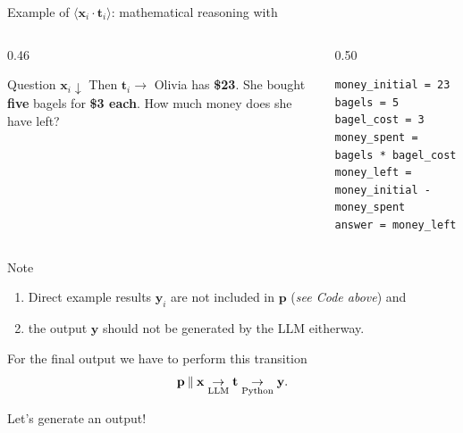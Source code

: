 \begin{frame}[fragile]{Example of \(\langle \mathbf{x}_i \cdot \mathbf{t}_i \rangle\): mathematical reasoning with \PAL{}}
\begin{columns}[T,totalwidth=\textwidth]
\begin{column}{0.46\textwidth}
\begin{block}{Question \(\mathbf{x}_i \downarrow \) \hfill Then \(\mathbf{t}_i \rightarrow\)}
Olivia has \textbf{\$23}. She bought \textbf{five} bagels for \textbf{\$3 each}. How much money does she have left? 
\end{block}
\end{column}
\begin{column}{0.50\textwidth}
\begin{lstlisting}[style=pythonstyle]
money_initial = 23
bagels = 5
bagel_cost = 3
money_spent = bagels * bagel_cost
money_left = money_initial - money_spent
answer = money_left
\end{lstlisting}
\end{column}
\end{columns}
\begin{alertblock}{Note}
  \begin{enumerate}
    \item Direct example results \(\mathbf{y}_i\) are not included in \(\mathbf{p}\) (\textit{see Code above}) and 
    \item the output \(\mathbf{y}\) should not be generated by the LLM eitherway.
  \end{enumerate}
  For the final output we have to perform this transition\[
    \mathbf{p} \mathbin{\|} \mathbf{x} \underset{\text{LLM}}{\rightarrow} \mathbf{t} \underset{\text{Python}}{\rightarrow} \mathbf{y}.
  \]
\end{alertblock}
\begin{center}
  \Large Let's generate an output! %
\end{center}
\end{frame}
